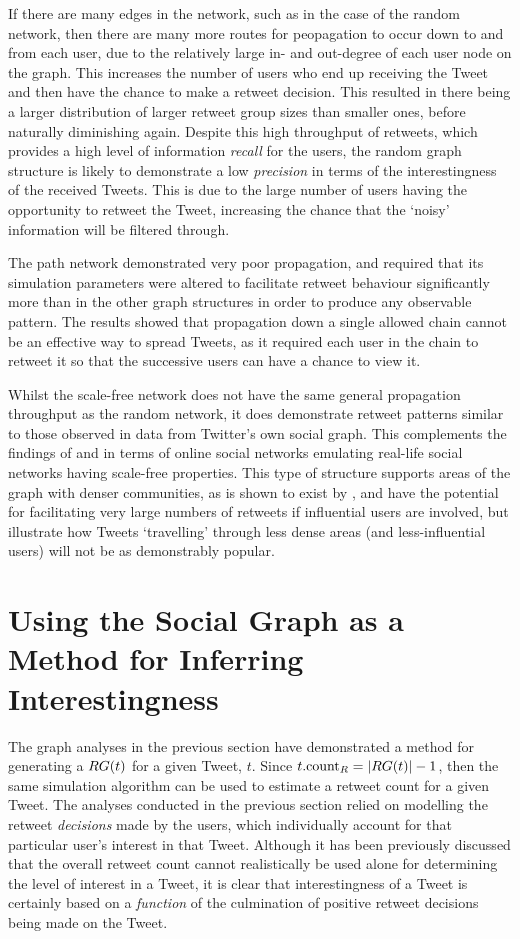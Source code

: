 If there are many edges in the network, such as in the case of the random network, then there are many more routes for peopagation to occur down to and from each user, due to the relatively large in- and out-degree of each user node on the graph. This increases the number of users who end up receiving the Tweet and then have the chance to make a retweet decision. This resulted in there being a larger distribution of larger retweet group sizes than smaller ones, before naturally diminishing again. Despite this high throughput of retweets, which provides a high level of information \textit{recall} for the users, the random graph structure is likely to demonstrate a low \textit{precision} in terms of the interestingness of the received Tweets. This is due to the large number of users having the opportunity to retweet the Tweet, increasing the chance that the `noisy' information will be filtered through.

The path network demonstrated very poor propagation, and required that its simulation parameters were altered to facilitate retweet behaviour significantly more than in the other graph structures in order to produce any observable pattern. The results showed that propagation down a single allowed chain cannot be an effective way to spread Tweets, as it required each user in the chain to retweet it so that the successive users can have a chance to view it.

Whilst the scale-free network does not have the same general propagation throughput as the random network, it does demonstrate retweet patterns similar to those observed in data from Twitter's own social graph. This complements the findings of \cite{mislove07} and \cite{hein06} in terms of online social networks emulating real-life social networks having scale-free properties. This type of structure supports areas of the graph with denser communities, as is shown to exist by \cite{java07}, and have the potential for facilitating very large numbers of retweets if influential users are involved, but illustrate how Tweets `travelling' through less dense areas (and less-influential users) will not be as demonstrably popular.



\section{Using the Social Graph as a Method for Inferring Interestingness}
The graph analyses in the previous section have demonstrated a method for generating a $RG(t)$ for a given Tweet, $t$. Since $t.\textrm{count}_R = |RG(t)| - 1$, then the same simulation algorithm can be used to estimate a retweet count for a given Tweet. The analyses conducted in the previous section relied on modelling the retweet \textit{decisions} made by the users, which individually account for that particular user's interest in that Tweet. Although it has been previously discussed that the overall retweet count cannot realistically be used alone for determining the level of interest in a Tweet, it is clear that interestingness of a Tweet is certainly based on a \textit{function} of the culmination of positive retweet decisions being made on the Tweet.

